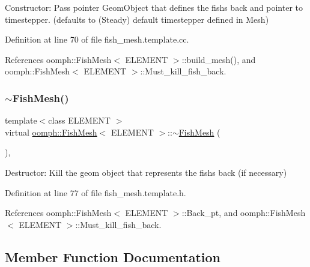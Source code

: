 Constructor\+: Pass pointer Geom\+Object that defines the fish\textquotesingle{}s back and pointer to timestepper. (defaults to (Steady) default timestepper defined in Mesh) 

Definition at line 70 of file fish\+\_\+mesh.\+template.\+cc.



References oomph\+::\+Fish\+Mesh$<$ E\+L\+E\+M\+E\+N\+T $>$\+::build\+\_\+mesh(), and oomph\+::\+Fish\+Mesh$<$ E\+L\+E\+M\+E\+N\+T $>$\+::\+Must\+\_\+kill\+\_\+fish\+\_\+back.

\mbox{\label{classoomph_1_1FishMesh_a3763b9be54c74d15a8c5b2129e0f4fae}} 
\subsubsection{\texorpdfstring{$\sim$\+Fish\+Mesh()}{~FishMesh()}}
{\footnotesize\ttfamily template$<$class E\+L\+E\+M\+E\+NT $>$ \\
virtual \hyperlink{classoomph_1_1FishMesh}{oomph\+::\+Fish\+Mesh}$<$ E\+L\+E\+M\+E\+NT $>$\+::$\sim$\hyperlink{classoomph_1_1FishMesh}{Fish\+Mesh} (\begin{DoxyParamCaption}{ }\end{DoxyParamCaption})\hspace{0.3cm}{\ttfamily [inline]}, {\ttfamily [virtual]}}



Destructor\+: Kill the geom object that represents the fish\textquotesingle{}s back (if necessary) 



Definition at line 77 of file fish\+\_\+mesh.\+template.\+h.



References oomph\+::\+Fish\+Mesh$<$ E\+L\+E\+M\+E\+N\+T $>$\+::\+Back\+\_\+pt, and oomph\+::\+Fish\+Mesh$<$ E\+L\+E\+M\+E\+N\+T $>$\+::\+Must\+\_\+kill\+\_\+fish\+\_\+back.



\subsection{Member Function Documentation}
\mbox{\label{classoomph_1_1FishMesh_aabde81364817d938f0924997bf4f63cc}} 

